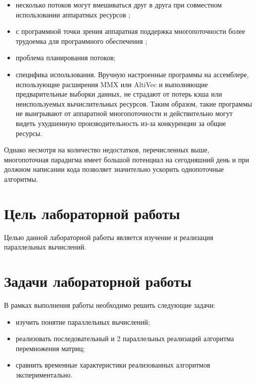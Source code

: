 \documentclass[12pt]{report}
\begin{document}
\begin{itemize}

	\item несколько потоков могут вмешиваться друг в друга при совместном использовании аппаратных ресурсов \cite{Nemirovsky};

	\item с программной точки зрения аппаратная поддержка многопоточности более трудоемка для программного обеспечения \cite{Olukotun};

	\item проблема планирования потоков;

	\item специфика использования. Вручную настроенные программы на ассемблере, использующие расширения MMX или AltiVec и выполняющие предварительные выборки данных, не страдают от потерь кэша или неиспользуемых вычислительных ресурсов. Таким образом, такие программы не выигрывают от аппаратной многопоточности и действительно могут видеть ухудшенную производительность из-за конкуренции за общие ресурсы.

\end{itemize}

Однако несмотря на количество недостатков, перечисленных выше, многопоточная парадигма имеет большой потенциал на сегодняшний день и при должном написании кода позволяет значительно ускорить однопоточные алгоритмы.

\section*{Цель лабораторной работы}
Целью данной лабораторной работы является изучение и реализация параллельных вычислений.

\section*{Задачи лабораторной работы}
\indent В рамках выполнения работы необходимо решить следующие задачи:

\begin{itemize}

	\item изучить понятие параллельных вычислений;

	\item реализовать последовательный и 2 параллельных реализаций алгоритма перемножения матриц;

	\item сравнить временные характеристики реализованных алгоритмов экспериментально.
\end{itemize}
\end{document}
